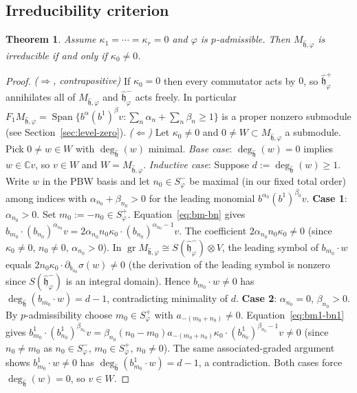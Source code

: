 \documentclass{amsart}
\DeclareMathOperator{\Span}{Span}
\DeclareMathOperator{\gr}{gr}
\newcommand{\Cx}{\mathbb{C}}
\newcommand{\h}{\mathfrak{h}}
\newcommand{\wh}[1]{\widehat{#1}}
\newcommand{\whh}{\wh{\h}}
\newtheorem{theorem}{Theorem}[section]
\theoremstyle{definition}
\theoremstyle{remark}
\numberwithin{equation}{section}
\begin{document}
\subsection{Irreducibility criterion}
\begin{theorem}\label{thm:A}
Assume $\kappa_1=\cdots=\kappa_r=0$ and $\varphi$ is $p$-admissible.
Then $M_{\whh,\varphi}$ is irreducible if and only if $\kappa_0\neq0$.
\end{theorem}
\begin{proof}
\textit{($\Rightarrow$, contrapositive)}
If $\kappa_0=0$ then every commutator acts by $0$, so $\whh_\varphi^+$
annihilates all of $M_{\whh,\varphi}$ and $\whh_\varphi^-$ acts freely.
In particular $F_1M_{\whh,\varphi}=\Span\{b^\alpha(b^1)^\beta v:\sum_n\alpha_n+\sum_n\beta_n\ge1\}$
is a proper nonzero submodule (see Section~\ref{sec:level-zero}).
\textit{($\Leftarrow$)}  Let $\kappa_0\neq0$ and $0\neq W\subset M_{\whh,\varphi}$
a submodule.  Pick $0\neq w\in W$ with $\deg_{\whh}(w)$ minimal.
\emph{Base case}: $\deg_{\whh}(w)=0$ implies $w\in\Cx v$, so $v\in W$
and $W=M_{\whh,\varphi}$.
\emph{Inductive case}: Suppose $d:=\deg_{\whh}(w)\ge1$.  Write $w$ in
the PBW basis and let $n_0\in S_\varphi^-$ be maximal (in our fixed
total order) among indices with $\alpha_{n_0}+\beta_{n_0}>0$ for the
leading monomial $b^{\alpha_0}(b^1)^{\beta_0}v$.
\textbf{Case 1}: $\alpha_{n_0}>0$.  Set $m_0:=-n_0\in S_\varphi^+$.
Equation~\eqref{eq:bm-bn} gives $b_{m_0}\cdot(b_{n_0})^{\alpha_{n_0}}v
=2\alpha_{n_0}n_0\kappa_0\cdot(b_{n_0})^{\alpha_{n_0}-1}v$.
The coefficient $2\alpha_{n_0}n_0\kappa_0\neq0$ (since $\kappa_0\neq0$,
$n_0\neq0$, $\alpha_{n_0}>0$).  In $\gr M_{\whh,\varphi}\cong S(\whh_\varphi^-)
\otimes V$, the leading symbol of $b_{m_0}\cdot w$ equals
$2n_0\kappa_0\cdot\partial_{b_{n_0}}\sigma(w)\neq0$ (the derivation of the
leading symbol is nonzero since $S(\whh_\varphi^-)$ is an integral domain).
Hence $b_{m_0}\cdot w\neq0$ has $\deg_{\whh}(b_{m_0}\cdot w)=d-1$,
contradicting minimality of $d$.
\textbf{Case 2}: $\alpha_{n_0}=0$, $\beta_{n_0}>0$.  By
$p$-admissibility choose $m_0\in S_\varphi^+$ with $a_{-(m_0+n_0)}\neq0$.
Equation~\eqref{eq:bm1-bn1} gives $b_{m_0}^1\cdot(b_{n_0}^1)^{\beta_{n_0}}v
=\beta_{n_0}(n_0-m_0)a_{-(m_0+n_0)}\kappa_0\cdot(b_{n_0}^1)^{\beta_{n_0}-1}v\neq0$
(since $n_0\neq m_0$ as $n_0\in S_\varphi^-$, $m_0\in S_\varphi^+$, $n_0\neq0$).
The same associated-graded argument shows $b_{m_0}^1\cdot w\neq0$ has
$\deg_{\whh}(b_{m_0}^1\cdot w)=d-1$, a contradiction.
Both cases force $\deg_{\whh}(w)=0$, so $v\in W$.
\end{proof}
\end{document}
